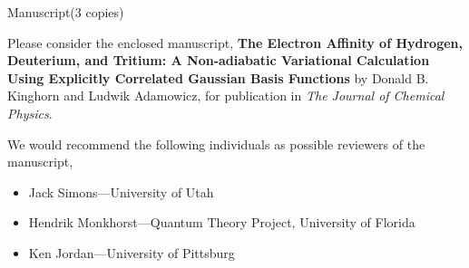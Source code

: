 \documentclass[12pt]{article}
\begin{document}
\begin{lettercc}
\end{lettercc}

\begin{letterencl}
Manuscript(3 copies)
\end{letterencl}

\begin{letteropening}
\end{letteropening}

Please consider the enclosed manuscript, \textbf{The Electron Affinity of
Hydrogen, Deuterium, and Tritium: A Non-adiabatic Variational Calculation
Using Explicitly Correlated Gaussian Basis Functions} by Donald B. Kinghorn
and Ludwik Adamowicz, for publication in \emph{The Journal of Chemical
Physics}.

We would recommend the following individuals as possible reviewers of the
manuscript,

\begin{itemize}
\item  Jack Simons---University of Utah

\item  Hendrik  Monkhorst---Quantum Theory Project, University of Florida

\item  Ken Jordan---University of Pittsburg 
\end{itemize}
\end{document}
